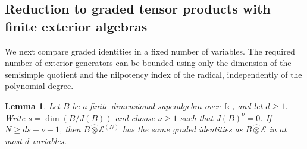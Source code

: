 \documentclass[11pt,reqno]{amsart}
\newcommand{\kk}{\Bbbk}
\newcommand{\E}{\mathcal E}
\newtheorem{lemma}[theorem]{Lemma}
\theoremstyle{definition}
\theoremstyle{remark}
\numberwithin{equation}{section}
\begin{document}
\subsection{Reduction to graded tensor products
with finite exterior algebras}\label{subsec:finite-exterior-reduction}

We next compare graded identities in a fixed number of variables.
The required number of exterior generators can be bounded using
only the dimension of the semisimple quotient and the nilpotency
index of the radical, independently of the polynomial degree.

\begin{lemma}\label{lem:finite-exterior}
Let $B$ be a finite-dimensional superalgebra over  $\kk$, and let $d\geq1$. Write $s=\dim(B/J(B))$ and choose $\nu\geq1$ such that $J(B)^\nu=0$. If $N\geq ds+\nu-1$, then
$B\mathbin{\widehat{\otimes}}\E^{(N)}$ has the same graded identities as
$B\mathbin{\widehat{\otimes}}\E$ in at most $d$ 
variables.
\end{lemma}
\end{document}
